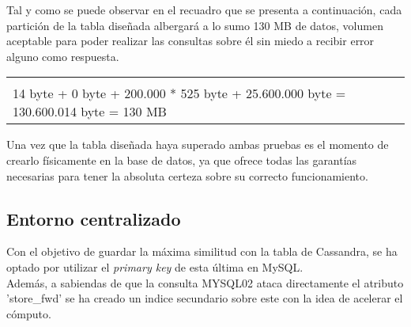 \begin{itemize}
	Tal y como se puede observar en el recuadro que se presenta a continuación, cada partición de la tabla diseñada albergará a lo sumo 130 MB de datos, volumen aceptable para poder realizar las consultas sobre él sin miedo a recibir error alguno como respuesta.
	
	\begin{table}[h!]
		\centering
		\begin{tabular}{|l|}
			
			\hline
			\\
			
			14 byte + 0 byte + 200.000 * 525 byte + 25.600.000 byte = 130.600.014 byte = 130 MB
			
			\\
			\hline
			
		\end{tabular}
	\end{table}
	
\end{itemize}

Una vez que la tabla diseñada haya superado ambas pruebas es el momento de crearlo físicamente en la base de datos, ya que ofrece todas las garantías necesarias para tener la absoluta certeza sobre su correcto funcionamiento.

\subsection{Entorno centralizado}

Con el objetivo de guardar la máxima similitud con la tabla de Cassandra, se ha optado por utilizar el \textit{primary key} de esta última en MySQL.\\

Además, a sabiendas de que la consulta MYSQL02 ataca directamente el atributo 'store\_fwd' se ha creado un indice secundario sobre este con la idea de acelerar el cómputo.\\

